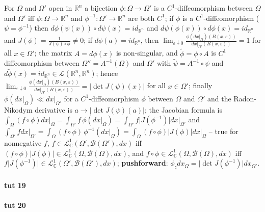 \documentclass[a4paper]{article}
\newcommand{\Lcal}{\mathcal{L}}
\newcommand{\Bcal}{\mathcal{B}}
\newcommand{\real}{\mathbb{R}}
\newcommand{\cplx}{\mathbb{C}}
\begin{document}
For $\Omega$ and $\Omega'$ open in $\real^n$ a bijection $\phi\colon \Omega \to \Omega'$ is a $C^1$-diffeomorphism between $\Omega$ and $\Omega'$ iff $\phi\colon \Omega \to \real^n$ and $\phi^{-1}\colon \Omega' \to \real^n$ are both $C^1$;
if $\phi$ is a $C^1$-diffeomorphism ($\psi = \phi^{-1}$) then $d\phi(\psi(x)) \circ d\psi(x) = id_{\real^n}$ and $d\psi(\phi(x)) \circ d\phi(x) = id_{\real^n}$ and $J(\phi) = \tfrac1{J(\psi) \circ \phi} \neq 0$;
if $d\phi(a) = id_{\real^n}$, then $\lim_{\varepsilon\downarrow 0} \tfrac{\phi(dx\big\vert_{\Omega})(B(x, \varepsilon))}{dx\big\vert_{\Omega'}(B(x, \varepsilon))} = 1$ for all $x\in \Omega'$;
the matrix $A = d\phi(x)$ is non-singular, and $\tilde{\phi} = \phi \circ A$ is $C^1$ diffeomorphism between $\Omega'' = A^{-1}(\Omega)$ and $\Omega'$ with $\tilde{\psi} = A^{-1} \circ \psi$ and $d\tilde{\phi}(x) = id_{\real^n} \in \Lcal(\real^n, \real^n)$;
hence $\lim_{\varepsilon\downarrow 0} \tfrac{\phi(dx\big\vert_{\Omega})(B(x, \varepsilon))}{dx\big\vert_{\Omega'}(B(x, \varepsilon))} = \lvert \det J(\psi)(x) \rvert$ for all $x\in \Omega'$;
finally $\phi(dx\big\vert_{\Omega}) \ll dx\big\vert_{\Omega'}$ for a $C^1$-diffeomorphism $\phi$ between $\Omega$ and $\Omega'$ and the Radon-Nikodym derivative is $a \to \lvert \det J(\psi)(a) \rvert$;
the Jacobian formula is $\int_\Omega (f\circ \phi) dx\big\vert_{\Omega} = \int_{\Omega'} f \, \phi(dx\big\vert_{\Omega}) = \int_{\Omega'} f \lvert J(\phi^{-1})\rvert dx\big\vert_{\Omega'}$ and $\int_{\Omega'} f dx\big\vert_{\Omega'} = \int_{\Omega} (f\circ \phi) \, \phi^{-1}(dx\big\vert_{\Omega}) = \int_{\Omega} (f\circ \phi) \lvert J(\phi)\rvert dx\big\vert_{\Omega}$ -- true for nonnegative $f$, $f\in \Lcal_\cplx^1(\Omega', \Bcal(\Omega'), dx)$ iff $(f \circ \phi) \lvert J(\phi) \rvert \in \Lcal_\cplx^1(\Omega, \Bcal(\Omega), dx)$, and $f \circ \phi \in \Lcal_\cplx^1(\Omega, \Bcal(\Omega), dx)$ iff $f \lvert J(\phi^{-1}) \rvert \in \Lcal_\cplx^1(\Omega', \Bcal(\Omega'), dx)$;
{\bf pushforward}: $\phi_\sharp dx_\Omega = \lvert \det J(\phi^{-1}) \rvert dx_{\Omega'}$.


\paragraph{tut 19} %
\label{par:tut_19}





\paragraph{tut 20} %
\label{par:tut_20}



\end{document}
